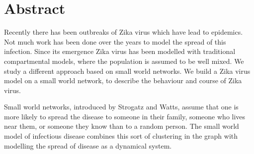 
\chapter*{Abstract} 
Recently there has been outbreaks of Zika virus which have lead to epidemics. Not much work has been done over the years to model the spread of this infection.
Since its emergence Zika virus has been modelled with traditional compartmental models, where the population is assumed to be well mixed.
We study a different approach based on small world networks. We build a Zika virus model on a small world network, to describe the behaviour and course of Zika virus.


Small world networks, introduced by Strogatz and Watts,
assume that one is more likely to spread the disease to someone in their family, someone who lives near them, or someone they know than to a random person. The small world model of infectious disease combines this sort of clustering in the graph with  modelling the spread of disease as a dynamical system.





